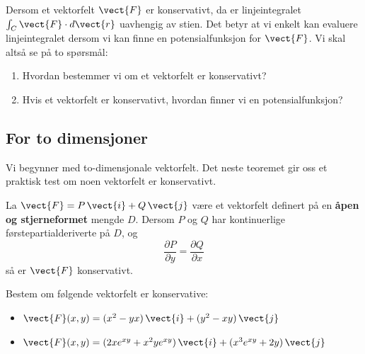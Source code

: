 Dersom et vektorfelt \( \vect{F} \) er konservativt, da er linjeintegralet \( \int_C \vect{F} \cdot d\vect{r} \) uavhengig av stien. 
Det betyr at vi enkelt kan evaluere linjeintegralet dersom vi kan finne en potensialfunksjon for \( \vect{F} \). 
Vi skal altså se på to spørsmål:
\begin{enumerate}
    \item Hvordan bestemmer vi om et vektorfelt er konservativt?
    \item Hvis et vektorfelt er konservativt, hvordan finner vi en potensialfunksjon?
\end{enumerate}

%
\subsection*{For to dimensjoner}
Vi begynner med to-dimensjonale vektorfelt. 
Det neste teoremet gir oss et praktisk test om noen vektorfelt er konservativt.

\begin{thm}\label{thm:kons_stjern_2D}
La \( \vect{F} = P\, \vect{i} + Q\, \vect{j} \) være et vektorfelt definert på en \textbf{åpen og stjerneformet} mengde \( D \). Dersom \( P \) og \( Q \) har kontinuerlige førstepartialderiverte på \( D \), og
\[
\frac{\partial P}{\partial y} = \frac{\partial Q}{\partial x}
\]
så er \( \vect{F} \) konservativt.
\end{thm}

\begin{eks}{}
Bestem om følgende vektorfelt er konservative:
\begin{itemize}
    \item[(a)] \( \vect{F}(x, y) = (x^2 - yx)\, \vect{i} + (y^2 - xy)\, \vect{j} \)
    \item[(b)] \( \vect{F}(x, y) = (2xe^{xy} + x^2 y e^{xy})\, \vect{i} + (x^3 e^{xy} + 2y)\, \vect{j} \)
\end{itemize}
\end{eks}

